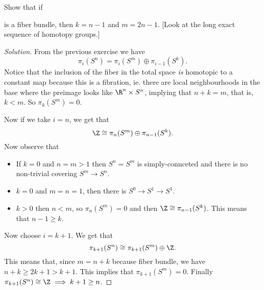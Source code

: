 \begin{exercise}[4.2.32]
	Show that if  is a fiber bundle, then $k=n-1$ and $m=2n-1$. [Look at the long exact sequence of homotopy groups.]
\end{exercise}
\begin{proof}[Solution]
	From the previous exercise we have
	\[
	\pi_i(S^n)=\pi_i(S^m)\oplus\pi_{i-1}(S^k)
	.\]
	Notice that the inclusion of the fiber in the total space \textit{is} homotopic to a constant map because this is a fibration, ie. there are local neighbourhoods in the base where the preimage looks like $\R^n\times S^n$, implying that $n+k=m$, that is, $k<m$. So $\pi_k(S^m)=0$.

	Now if we take $i=n$, we get that
	\[
	\Z\cong \pi_{n}(S^m)\oplus\pi_{n-1}(S^k)
	.\]
	Now observe that
	\begin{itemize}
		\item If $k=0$ and $n=m>1$ then $S^n=S^m$ is simply-connceted and there is no non-trivial covering $S^m\to S^n$.
		\item $k=0$  and $m=n=1$, then there is $S^0\to S^1\to S^1$.
		\item $k>0$ then $n<m$, so $\pi_{n}(S^m)=0$ and then $\Z\cong \pi_{n-1}(S^k)$. This means that $n-1\geq k$.
	\end{itemize}

	Now choose $i=k+1$. We get that
\[
\pi_{k+1}(S^n)\cong \pi_{k+1}(S^m)\oplus\Z
.\]
This means that, since $m=n+k$ because fiber bundle, we have $n+k\geq 2k+1>k+1$. This implies that $\pi_{k+1}(S^m)=0$. Finally $\pi_{k+1}(S^n)\cong \Z\implies k+1\geq n$.
\end{proof}

